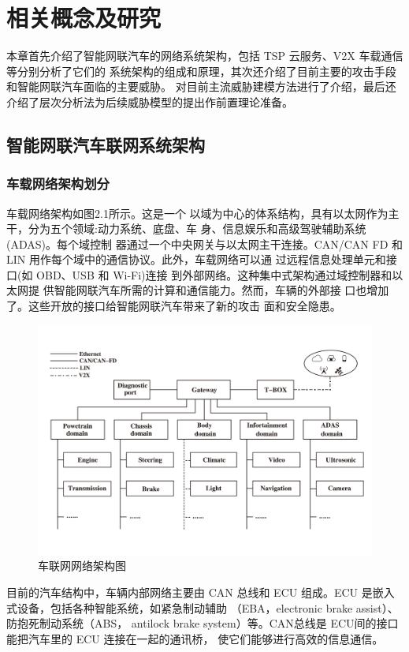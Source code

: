\chapter{相关概念及研究}
\label{ch2}

本章首先介绍了智能网联汽车的网络系统架构，包括 TSP 云服务、V2X 车载通信等分别分析了它们的
系统架构的组成和原理，其次还介绍了目前主要的攻击手段和智能网联汽车面临的主要威胁。
对目前主流威胁建模方法进行了介绍，最后还介绍了层次分析法为后续威胁模型的提出作前置理论准备。

\section{智能网联汽车联网系统架构}

\subsection{车载网络架构划分}
车载网络架构如图2.1所示。这是一个
以域为中心的体系结构，具有以太网作为主干，分为五个领域:动力系统、底盘、车
身、信息娱乐和高级驾驶辅助系统(ADAS)。每个域控制
器通过一个中央网关与以太网主干连接。CAN/CAN FD 和
LIN 用作每个域中的通信协议。此外，车载网络可以通
过远程信息处理单元和接口(如 OBD、USB 和 Wi-Fi)连接
到外部网络。这种集中式架构通过域控制器和以太网提
供智能网联汽车所需的计算和通信能力。然而，车辆的外部接
口也增加了。这些开放的接口给智能网联汽车带来了新的攻击
面和安全隐患。
\begin{figure}
  \centering
  \includegraphics[scale=0.4]{resources/img/i1.jpg}
  \caption{车联网网络架构图}
\end{figure}
目前的汽车结构中，车辆内部网络主要由 CAN
总线和 ECU 组成。ECU 是嵌入式设备，包括各种智能系统，如紧急制动辅助
（EBA，electronic brake assist）、防抱死制动系统（ABS，
antilock brake system）等。CAN总线是 ECU间的接口
能把汽车里的 ECU 连接在一起的通讯桥，
使它们能够进行高效的信息通信。

